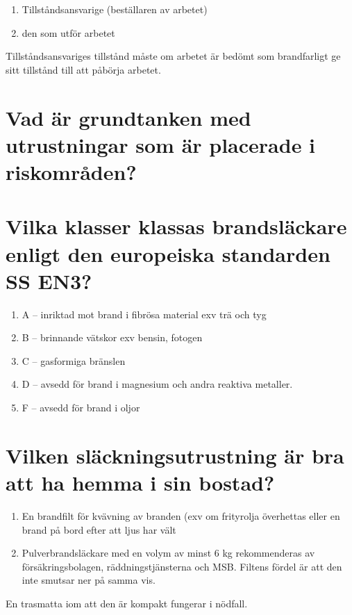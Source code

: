 \documentclass[a4paper,swedish]{article}
\begin{document}
\begin{enumerate}
\item Tillståndsansvarige (beställaren av arbetet)
\item den som utför arbetet
\end{enumerate}

Tillståndsansvariges tillstånd måste om arbetet är bedömt som brandfarligt ge sitt tillstånd till att påbörja arbetet.

\setcounter{section}{41}
\section{Vad är grundtanken med utrustningar som är placerade i riskområden?}

\setcounter{section}{43}
\section{Vilka klasser klassas brandsläckare enligt den europeiska standarden SS EN3?}

\begin{enumerate}
\item A -- inriktad mot brand i fibrösa material exv trä och tyg
\item B -- brinnande vätskor exv bensin, fotogen
\item C -- gasformiga bränslen
\item D -- avsedd för brand i magnesium och andra reaktiva metaller.
\item F -- avsedd för brand i oljor
\end{enumerate}

\setcounter{section}{45}
\section{Vilken släckningsutrustning är bra att ha hemma i sin bostad?}\label{sec:slackutrustning}

\begin{enumerate}
\item En brandfilt för kvävning av branden (exv om frityrolja överhettas eller en brand på bord
  efter att ljus har vält
\item Pulverbrandsläckare med en volym av minst 6 kg rekommenderas av försäkringsbolagen, räddningstjänsterna och MSB. Filtens fördel är att den inte smutsar ner på samma vis.
\end{enumerate}

En trasmatta iom att den är kompakt fungerar i nödfall.
\end{document}
